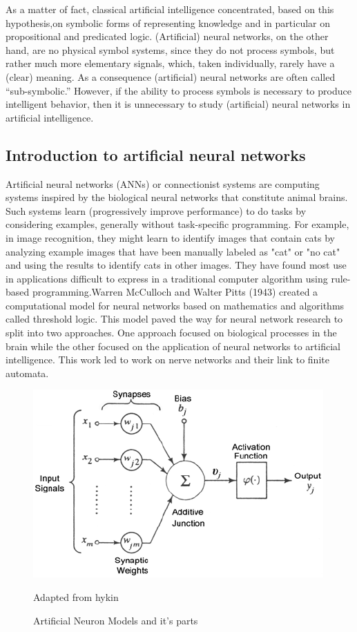 \documentclass[12pt]{article}
\begin{document}
As a matter of fact, classical artificial intelligence concentrated, based on this hypothesis,on symbolic forms of representing knowledge and in particular on propositional and predicated
logic. (Artificial) neural networks, on the other hand, are no physical symbol systems, since they do not process symbols, but rather much more elementary signals, which, taken individually, rarely have a (clear) meaning. As a consequence (artificial) neural networks are often called “sub-symbolic.” However, if the ability to process symbols is necessary to produce intelligent behavior, then it is unnecessary to study (artificial) neural networks in artificial intelligence. \vspace{10mm}
    \subsection{Introduction to artificial neural networks}

	Artificial neural networks (ANNs) or connectionist systems are computing systems inspired by the biological neural networks that constitute animal brains. Such systems learn (progressively improve performance) to do tasks by considering examples, generally without task-specific programming. For example, in image recognition, they might learn to identify images that contain cats by analyzing example images that have been manually labeled as "cat" or "no cat" and using the results to identify cats in other images. They have found most use in applications difficult to express in a traditional computer algorithm using rule-based programming.Warren McCulloch and Walter Pitts (1943) created a computational model for neural networks based on mathematics and algorithms called threshold logic. This model paved the way for neural network research to split into two approaches. One approach focused on biological processes in the brain while the other focused on the application of neural networks to artificial intelligence. This work led to work on nerve networks and their link to finite automata.
	
	 \begin{figure}[h]
    	\centering
    	\includegraphics[width=0.55 \textwidth]{c.png}
    	\caption{Artificial Neuron Models and it's parts}
    	\label{fig:mesh3}
    	Adapted from hykin 
	\end{figure}   
	
\end{document}
